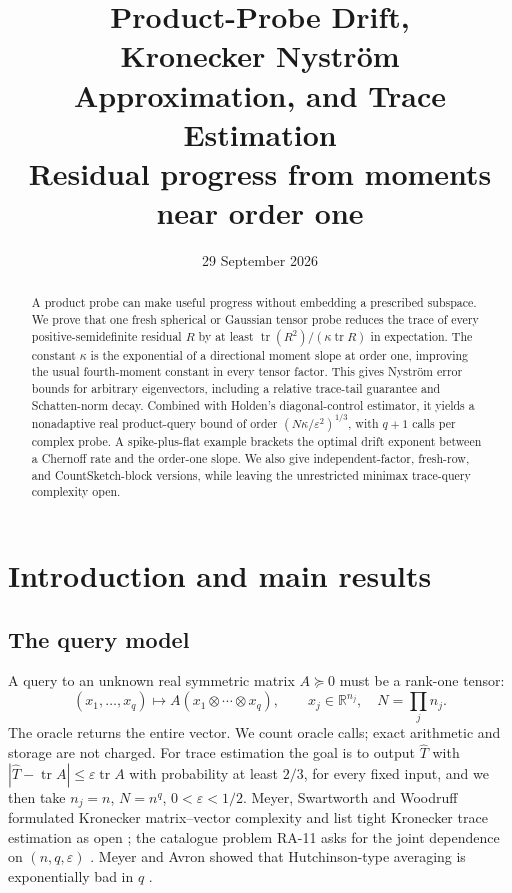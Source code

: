 \documentclass[11pt,a4paper]{article}
\title{\bfseries Product-Probe Drift,\\ Kronecker Nystr\"om Approximation, and Trace Estimation\\[4pt]
\large Residual progress from moments near order one}
\author{}
\date{29 September 2026}
\theoremstyle{definition}\newtheorem{definition}[theorem]{Definition}
\theoremstyle{remark}\newtheorem{remark}[theorem]{Remark}
\numberwithin{equation}{section}
\newcommand{\R}{\mathbb R}
\newcommand{\tr}{\operatorname{tr}}
\newcommand{\eps}{\varepsilon}
\begin{document}
\maketitle

\begin{abstract}
A product probe can make useful progress without embedding a prescribed
subspace. We prove that one fresh spherical or Gaussian tensor probe reduces
the trace of every positive-semidefinite residual \(R\) by at least
\(\tr(R^2)/(\kappa\tr R)\) in expectation. The constant \(\kappa\) is the
exponential of a directional moment slope at order one, improving the
usual fourth-moment constant in every tensor factor. This gives Nystr\"om
error bounds for arbitrary eigenvectors, including a relative trace-tail
guarantee and Schatten-norm decay. Combined with Holden's diagonal-control
estimator, it yields a nonadaptive real product-query bound of order
\((N\kappa/\varepsilon^2)^{1/3}\), with \(q+1\) calls per complex probe.
A spike-plus-flat example brackets the optimal drift exponent between a
Chernoff rate and the order-one slope. We also give independent-factor,
fresh-row, and CountSketch-block versions, while leaving the unrestricted
minimax trace-query complexity open.
\end{abstract}

\tableofcontents

\section{Introduction and main results}\label{sec:intro}

\subsection{The query model}
A query to an unknown real symmetric matrix $A\succeq0$ must be a rank-one
tensor:
\begin{equation}\label{eq:oracle}
 (x_1,\ldots,x_q)\longmapsto A(x_1\otimes\cdots\otimes x_q),
 \qquad x_j\in\R^{n_j},\quad N=\textstyle\prod_jn_j .
\end{equation}
The oracle returns the entire vector. We count oracle calls; exact arithmetic
and storage are not charged. For trace estimation the goal is to output
$\widehat T$ with $|\widehat T-\tr A|\le\eps\tr A$ with probability at least
$2/3$, for every fixed input, and we then take $n_j=n$, $N=n^q$,
$0<\eps<1/2$. Meyer, Swartworth and Woodruff formulated Kronecker
matrix--vector complexity and list tight Kronecker trace estimation as open
\cite{MSW}; the catalogue problem RA-11 asks for the joint dependence on
$(n,q,\eps)$ \cite{RA11cat}. Meyer and Avron showed that Hutchinson-type
averaging is exponentially bad in $q$ \cite{MA}.
\end{document}

